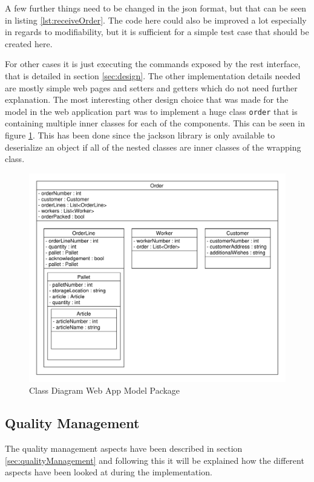 A few further things need to be changed in the json format, but that can be seen in listing \ref{lst:receiveOrder}. The code here could also be improved a lot especially in regards to modifiability, but it is sufficient for a simple test case that should be created here.

For other cases it is just executing the commands exposed by the rest interface, that is detailed in section \ref{sec:design}. The other implementation details needed are mostly simple web pages and \gls{setter}s and \gls{getter}s which do not need further explanation. The most interesting other design choice that was made for the model in the web application part was to implement a huge class \texttt{order} that is containing multiple inner classes for each of the components. This can be seen in figure \ref{fig:modelInnerClasses}. This has been done since the jackson library is only available to deserialize an object if all of the nested classes are inner classes of the wrapping class. 

\begin{figure}[htbp]
	\includegraphics[width=\linewidth]{images/WebAppModel}
	\caption{Class Diagram Web App Model Package}
	\label{fig:modelInnerClasses}
\end{figure}

\subsection{Quality Management}
The quality management aspects have been described in section \ref{sec:qualityManagement} and following this it will be explained how the different aspects have been looked at during the implementation.

